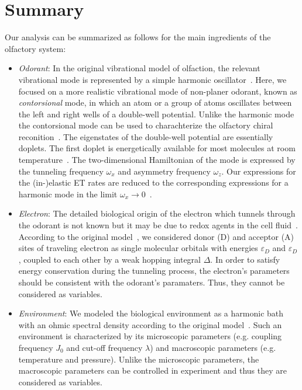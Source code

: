 \documentclass[aps,prl,tightenlines,onecolumn,superscriptaddress]{revtex4}
\begin{document}
\section{Summary}
Our analysis can be summarized as follows for the main ingredients of the olfactory system: \\
\begin{itemize}
  \item {\it Odorant}: In the original vibrational model of olfaction, the relevant vibrational mode is represented by a simple harmonic oscillator~\cite{Bro}. Here, we focused on a more realistic vibrational mode of non-planer odorant, known as {\it contorsional} mode, in which an atom or a group of atoms oscillates between the left and right wells of a double-well potential. Unlike the harmonic mode the contorsional mode can be used to charachterize the olfactory chiral reconition~\cite{Tir}. The eigenstates of the double-well potential are essentially doplets. The first doplet is energetically available for most molecules at room temperature~\cite{Tow,Her}. The two-dimensional Hamiltonian of the mode is expressed by the tunneling frequency $\omega_{x}$ and asymmetry frequency $\omega_{z}$. Our expressions for the (in-)elastic ET rates are reduced to the corresponding expressions for a harmonic mode in the limit $\omega_{x}\rightarrow0$~\cite{Che}.
\item {\it Electron}: The detailed biological origin of the electron which tunnels through the odorant is not known but it may be due to redox agents in the cell fluid~\cite{Row}. According to the original model~\cite{Bro}, we considered donor (D) and acceptor (A) sites of traveling electron as single molecular orbitals with energies $\varepsilon_{D}$ and $\varepsilon_{D}$, coupled to each other by a weak hopping integral $\Delta$. In order to satisfy energy conservation during the tunneling process, the electron's parameters should be consistent with the odorant's paramaters. Thus, they cannot be considered as variables.
  \item {\it Environment}: We modeled the biological environment as a harmonic bath with an ohmic spectral density according to the original model~\cite{Bro}. Such an environment is characterized by its microscopic parameters (e.g. coupling frequency $ J_{0}$ and cut-off frequency $\lambda$) and macroscopic parameters (e.g. temperature and pressure). Unlike the microscopic parameters, the macroscopic parameters can be controlled in experiment and thus they are considered as variables.
\end{itemize}
\end{document}
